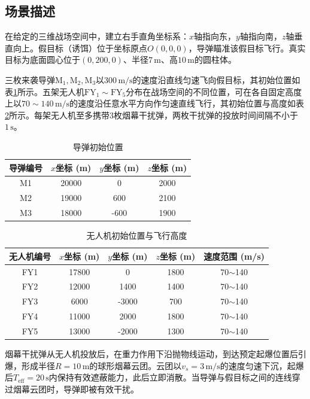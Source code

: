 \documentclass[12pt,a4paper]{ctexart}
\begin{document}
\subsection{场景描述}

在给定的三维战场空间中，建立右手直角坐标系：$x$轴指向东，$y$轴指向南，$z$轴垂直向上。假目标（诱饵）位于坐标原点$O(0,0,0)$，导弹瞄准该假目标飞行。真实目标为底面圆心位于$(0,200,0)$、半径$7\,\text{m}$、高$10\,\text{m}$的圆柱体。

三枚来袭导弹$\text{M}_1,\text{M}_2,\text{M}_3$以$300\,\text{m/s}$的速度沿直线匀速飞向假目标，其初始位置如表\ref{tab:missile}所示。五架无人机$\text{FY}_1\sim\text{FY}_5$分布在战场空间的不同位置，可在各自固定高度上以$70\sim140\,\text{m/s}$的速度沿任意水平方向作匀速直线飞行，其初始位置与高度如表\ref{tab:uav}所示。每架无人机至多携带3枚烟幕干扰弹，两枚干扰弹的投放时间间隔不小于$1\,\text{s}$。

\begin{table}[H]
\centering
\caption{导弹初始位置}
\label{tab:missile}
\begin{tabular}{cccc}
\toprule
导弹编号 & $x$坐标 (m) & $y$坐标 (m) & $z$坐标 (m) \\
\midrule
M1 & 20000 & 0    & 2000 \\
M2 & 19000 & 600  & 2100 \\
M3 & 18000 & -600 & 1900 \\
\bottomrule
\end{tabular}
\end{table}

\begin{table}[H]
\centering
\caption{无人机初始位置与飞行高度}
\label{tab:uav}
\begin{tabular}{ccccc}
\toprule
无人机编号 & $x$坐标 (m) & $y$坐标 (m) & $z$坐标 (m) & 速度范围 (m/s) \\
\midrule
FY1 & 17800 & 0     & 1800 & 70$\sim$140 \\
FY2 & 12000 & 1400  & 1400 & 70$\sim$140 \\
FY3 & 6000  & -3000 & 700  & 70$\sim$140 \\
FY4 & 11000 & 2000  & 1800 & 70$\sim$140 \\
FY5 & 13000 & -2000 & 1300 & 70$\sim$140 \\
\bottomrule
\end{tabular}
\end{table}

烟幕干扰弹从无人机投放后，在重力作用下沿抛物线运动，到达预定起爆位置后引爆，形成半径$R=10\,\text{m}$的球形烟幕云团。云团以$v_s=3\,\text{m/s}$的速度匀速下沉，起爆后$T_{\text{eff}}=20\,\text{s}$内保持有效遮蔽能力，此后立即消散。当导弹与假目标之间的连线穿过烟幕云团时，导弹即被有效干扰。
\end{document}
